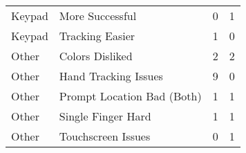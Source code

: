 \begin{tabular}{llrr}
  Keypad &              More Successful &         0 &         1 \\
  Keypad &              Tracking Easier &         1 &         0 \\
   Other &              Colors Disliked &         2 &         2 \\
   Other &         Hand Tracking Issues &         9 &         0 \\
   Other &   Prompt Location Bad (Both) &         1 &         1 \\
   Other &           Single Finger Hard &         1 &         1 \\
   Other &           Touchscreen Issues &         0 &         1 \\
\bottomrule
\end{tabular}
